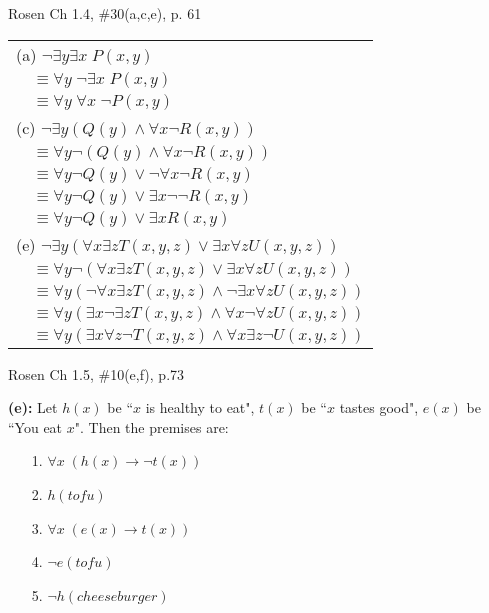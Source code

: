 \documentclass[12pt]{exam}
\begin{document}
\begin{questions}
\question Rosen Ch 1.4, \#30(a,c,e), p. 61
    \begin{solution}

    \begin{tabular}{ll}
        \multicolumn{2}{l}{(a) $\neg \exists y \exists x\; P(x,y)$} \\
        \hspace{0.5in} & $\equiv \forall y\; \neg \exists x\; P(x,y)$ \\
          & $\equiv \forall y\; \forall x\; \neg P(x,y)$ \\
    \hline
        \multicolumn{2}{l}{(c) $\neg \exists y (Q(y) \wedge \forall x \neg R(x,y))$} \\
            & $\equiv \forall y \neg (Q(y) \wedge \forall x \neg R(x,y))$ \\
            & $\equiv \forall y \neg Q(y) \vee \neg \forall x \neg R(x,y)$ \\
            & $\equiv \forall y \neg Q(y) \vee \exists x \neg \neg R(x,y)$ \\
            & $\equiv \forall y \neg Q(y) \vee \exists x R(x,y)$ \\
    \hline
        \multicolumn{2}{l}{(e) $\neg \exists y (\forall x \exists z T(x,y,z) \vee \exists x \forall z U(x,y,z))$} \\
            & $\equiv \forall y \neg (\forall x \exists z T(x,y,z) \vee \exists x \forall z U(x,y,z))$ \\
            & $\equiv \forall y (\neg \forall x \exists z T(x,y,z) \wedge \neg \exists x \forall z U(x,y,z))$ \\
            & $\equiv \forall y (\exists x \neg \exists z T(x,y,z) \wedge \forall x \neg \forall z U(x,y,z))$ \\
            & $\equiv \forall y (\exists x \forall z \neg T(x,y,z) \wedge \forall x \exists z \neg U(x,y,z))$ \\
    \end{tabular}
    \end{solution}


\question Rosen Ch 1.5, \#10(e,f), p.73
    \begin{solution}
    \textbf{(e):} Let $h(x)$ be ``$x$ is healthy to eat", $t(x)$ be ``$x$ tastes good", $e(x)$ be ``You eat $x$".  Then the premises are:
    \begin{itemize}
        \item[1.] $\forall x\; (h(x) \rightarrow \neg t(x))$
        \item[2.] $h(tofu)$
        \item[3.] $\forall x\; (e(x) \rightarrow t(x))$
        \item[4.] $\neg e(tofu)$
        \item[5.] $\neg h(cheeseburger)$
    \end{itemize}


\end{solution}
\end{questions}
\end{document}

